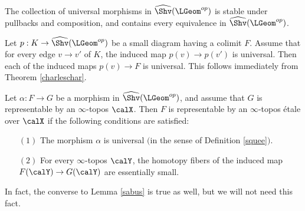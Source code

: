 \begin{remark}
The collection of universal morphisms in $\widehat{\Shv}(\LGeom^{op})$ is stable under pullbacks
and composition, and contains every equivalence in $\widehat{\Shv}(\LGeom^{op})$.
\end{remark}

\begin{remark}\label{sapper}
Let $p: K \rightarrow \widehat{\Shv}(\LGeom^{op})$ be a small diagram having a colimit $F$.
Assume that for every edge $v \rightarrow v'$ of $K$, the induced map $p(v) \rightarrow p(v')$
is universal. Then each of the induced maps $p(v) \rightarrow F$ is universal. This follows immediately from Theorem \ref{charleschar}.
\end{remark}

\begin{lemma}\label{sabus}
Let $\alpha: F \rightarrow G$ be a morphism in $\widehat{\Shv}(\LGeom^{op})$, and assume
that $G$ is representable by an $\infty$-topos $\calX$. Then $F$ is representable by an
$\infty$-topos \'{e}tale over $\calX$ if the following conditions are satisfied:
\begin{itemize}
\item[$(1)$] The morphism $\alpha$ is universal $($in the sense of Definition \ref{squee}$)$.
\item[$(2)$] For every $\infty$-topos $\calY$, the homotopy fibers of the induced map
$F(\calY) \rightarrow G(\calY)$ are essentially small.
\end{itemize}
\end{lemma}

\begin{remark}
In fact, the converse to Lemma \ref{sabus} is true as well, but we will not need this fact.
\end{remark}

